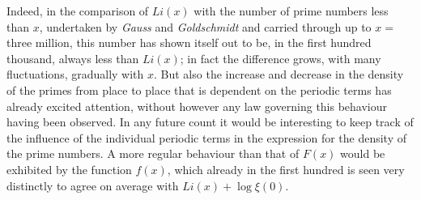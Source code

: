 \documentclass[a4paper,12pt]{article}
\begin{document}
Indeed, in the comparison of ${Li}(x)$ with the number of prime
numbers less than $x$, undertaken by \emph{Gauss} and
\emph{Goldschmidt} and carried through up to $x =$ three
million, this number has shown itself out to be, in the first
hundred thousand, always less than ${Li}(x)$; in fact the
difference grows, with many fluctuations, gradually with $x$.
But also the increase and decrease in the density of the primes
from place to place that is dependent on the periodic terms
has already excited attention, without however any law governing
this behaviour having been observed.  In any future count
it would be interesting to keep track of the influence
of the individual periodic terms in the expression for the
density of the prime numbers.  A more regular behaviour than
that of $F(x)$ would be exhibited by the function $f(x)$,
which already in the first hundred is seen very distinctly
to agree on average with ${Li}(x) + \log \xi(0)$.
\end{document}
